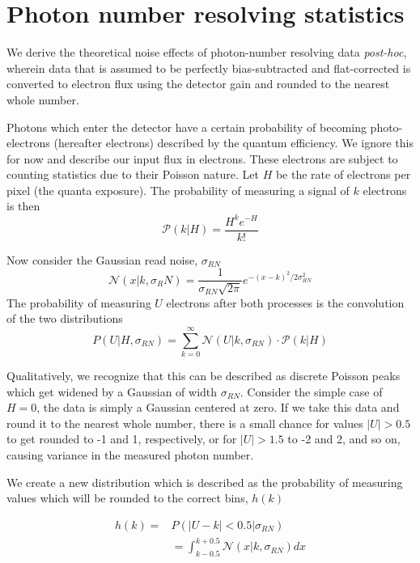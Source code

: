 \section{Photon number resolving statistics}\label{sec:pnr_derivation}

We derive the theoretical noise effects of photon-number resolving data \textit{post-hoc}, wherein data that is assumed to be perfectly bias-subtracted and flat-corrected is converted to electron flux using the detector gain and rounded to the nearest whole number.

Photons which enter the detector have a certain probability of becoming photo-electrons (hereafter electrons) described by the quantum efficiency. We ignore this for now and describe our input flux in electrons. These electrons are subject to counting statistics due to their Poisson nature. Let $H$ be the rate of electrons per pixel (the quanta exposure). The probability of measuring a signal of $k$ electrons is then
\begin{equation}
    \mathcal{P}\left(k | H\right) = \frac{H^k e^{-H}}{k!}
\end{equation}

Now consider the Gaussian read noise, $\sigma_{RN}$
\begin{equation}
    \mathcal{N}\left(x | k, \sigma_RN\right) = \frac{1}{\sigma_{RN}\sqrt{2\pi}}e^{-(x - k)^2 / 2\sigma_{RN}^2}
\end{equation}
The probability of measuring $U$ electrons after both processes is the convolution of the two distributions
\begin{equation}
    P(U | H, \sigma_{RN}) = \sum_{k=0}^\infty{\mathcal{N}\left(U | k, \sigma_{RN}\right)\cdot \mathcal{P}\left(k|H\right)}
\end{equation}

Qualitatively, we recognize that this can be described as discrete Poisson peaks which get widened by a Gaussian of width $\sigma_{RN}$. Consider the simple case of $H=0$, the data is simply a Gaussian centered at zero. If we take this data and round it to the nearest whole number, there is a small chance for values $|U|>0.5$  to get rounded to -1 and 1, respectively, or for $|U| > 1.5$ to -2 and 2, and so on, causing variance in the measured photon number. 

We create a new distribution which is described as the probability of measuring values which will be rounded to the correct bins, $h(k)$

\begin{align}
    h(k) = &P\left(|U - k| < 0.5 | \sigma_{RN}\right) \\
    &= \int_{k - 0.5}^{k + 0.5}{\mathcal{N}(x | k, \sigma_{RN}) dx}
\end{align}


